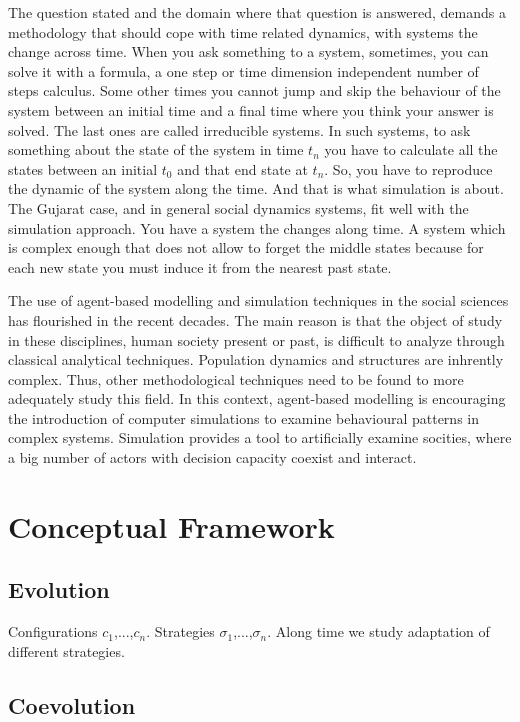 \documentclass{report}
\begin{document}
The question stated and the domain where that question is answered, demands a methodology that should cope with time related dynamics, with systems the change across time. When you ask something to a system, sometimes, you can solve it with a formula, a one step or time dimension independent number of steps calculus. Some other times you cannot jump and skip the behaviour of the system between an initial time and a final time where you think your answer is solved. The last ones are called irreducible systems. In such systems, to ask something about the state of the system in time $t_n$ you have to calculate all the states between an initial $t_0$ and that end state at $t_n$. So, you have to reproduce the dynamic of the system along the time. And that is what simulation is about. 
The Gujarat case, and in general social dynamics systems, fit well with the simulation approach. You have a system the changes along time. A system which is complex enough that does not allow to forget the middle states because for each new state you must induce it from the nearest past state.


The use of agent-based modelling and simulation techniques in the social sciences has flourished in the recent decades. 
The main reason is that the object of study in these disciplines, human society present or past, is difficult to analyze through classical analytical 
techniques. Population dynamics and structures are inhrently complex. Thus, other methodological techniques need to be found to more adequately study 
this field. In this context, agent-based modelling is encouraging the introduction of computer simulations to examine behavioural patterns in complex systems.
Simulation provides a tool to artificially examine socities, where a big number of actors with decision capacity coexist and interact.




	\section{Conceptual Framework}


		\subsection{Evolution}

Configurations $c_1$,...,$c_n$. Strategies $\sigma_1$,...,$\sigma_n$. Along time we study adaptation of different strategies. 

		\subsection{Coevolution}
\end{document}
